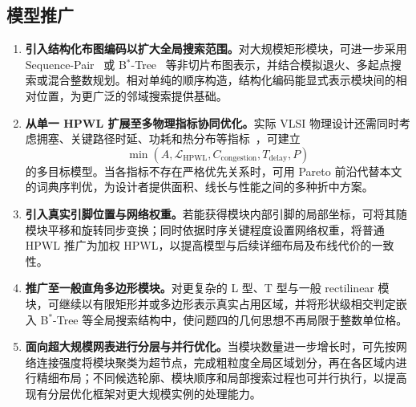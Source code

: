 \subsection{模型推广}
\begin{enumerate}[label=\arabic*.,leftmargin=2.4em,itemsep=0.35em]
  \item \textbf{引入结构化布图编码以扩大全局搜索范围。}对大规模矩形模块，可进一步采用 Sequence-Pair~\cite{murata1996} 或 B$^*$-Tree~\cite{chang2000} 等非切片布图表示，并结合模拟退火、多起点搜索或混合整数规划。相对单纯的顺序构造，结构化编码能显式表示模块间的相对位置，为更广泛的邻域搜索提供基础。
  \item \textbf{从单一 HPWL 扩展至多物理指标协同优化。}实际 VLSI 物理设计还需同时考虑拥塞、关键路径时延、功耗和热分布等指标~\cite{kahng2011}，可建立
  \begin{equation}
    \min\left(A,\mathcal{L}_{\mathrm{HPWL}},C_{\mathrm{congestion}},T_{\mathrm{delay}},P\right)
  \end{equation}
  的多目标模型。当各指标不存在严格优先关系时，可用 Pareto 前沿代替本文的词典序判优，为设计者提供面积、线长与性能之间的多种折中方案。
  \item \textbf{引入真实引脚位置与网络权重。}若能获得模块内部引脚的局部坐标，可将其随模块平移和旋转同步变换；同时依据时序关键程度设置网络权重，将普通 HPWL 推广为加权 HPWL，以提高模型与后续详细布局及布线代价的一致性。
  \item \textbf{推广至一般直角多边形模块。}对更复杂的 L 型、T 型与一般 rectilinear 模块，可继续以有限矩形并或多边形表示真实占用区域，并将形状级相交判定嵌入 B$^*$-Tree 等全局搜索结构中，使问题四的几何思想不再局限于整数单位格。
  \item \textbf{面向超大规模网表进行分层与并行优化。}当模块数量进一步增长时，可先按网络连接强度将模块聚类为超节点，完成粗粒度全局区域划分，再在各区域内进行精细布局；不同候选轮廓、模块顺序和局部搜索过程也可并行执行，以提高现有分层优化框架对更大规模实例的处理能力。
\end{enumerate}
